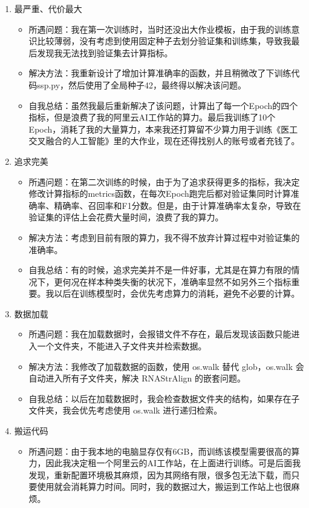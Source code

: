 \documentclass[a4paper,12pt]{article}
\begin{document}
\begin{enumerate}
    \item 最严重、代价最大
    \begin{itemize}
        \item 所遇问题：我在第一次训练时，当时还没出大作业模板，由于我的训练意识比较薄弱，没有考虑到使用固定种子去划分验证集和训练集，导致我最后发现我无法找到验证集去计算指标。
        \item 解决方法：我重新设计了增加计算准确率的函数，并且稍微改了下训练代码ssp.py，然后使用了全局种子42，最终得以解决该问题。
        \item 自我总结：虽然我最后重新解决了该问题，计算出了每一个Epoch的四个指标，但是浪费了我的阿里云AI工作站的算力。最后我训练了10个Epoch，消耗了我的大量算力，本来我还打算留不少算力用于训练《医工交叉融合的人工智能》里的大作业，现在还得找别人的账号或者充钱了。
    \end{itemize}
    \item 追求完美
    \begin{itemize}
        \item 所遇问题：在第二次训练的时候，由于为了追求获得更多的指标，我决定修改计算指标的metrics函数，在每次Epoch跑完后都对验证集同时计算准确率、精确率、召回率和F1分数。但是，由于计算准确率太复杂，导致在验证集的评估上会花费大量时间，浪费了我的算力。
        \item 解决方法：考虑到目前有限的算力，我不得不放弃计算过程中对验证集的准确率。
        \item 自我总结：有的时候，追求完美并不是一件好事，尤其是在算力有限的情况下，更何况在样本种类失衡的状况下，准确率显然不如另外三个指标重要。我以后在训练模型时，会优先考虑算力的消耗，避免不必要的计算。
    \end{itemize}
    \item 数据加载
    \begin{itemize}
        \item 所遇问题：我在加载数据时，会报错文件不存在，最后发现该函数只能进入一个文件夹，不能进入子文件夹并检索数据。
        \item 解决方法：我修改了加载数据的函数，使用 os.walk 替代 glob，os.walk 会自动进入所有子文件夹，解决 RNAStrAlign 的嵌套问题。
        \item 自我总结：以后在加载数据时，我会检查数据文件夹的结构，如果存在子文件夹，我会优先考虑使用 os.walk 进行递归检索。
    \end{itemize}
    \item 搬运代码
    \begin{itemize}
        \item 所遇问题：由于我本地的电脑显存仅有6GB，而训练该模型需要很高的算力，因此我决定租一个阿里云的AI工作站，在上面进行训练。可是后面我发现，重新配置环境极其麻烦，因为其网络有限，很多包无法下载，而只要使用就会消耗算力时间。同时，我的数据过大，搬运到工作站上也很麻烦。

\end{itemize}
\end{enumerate}
\end{document}
